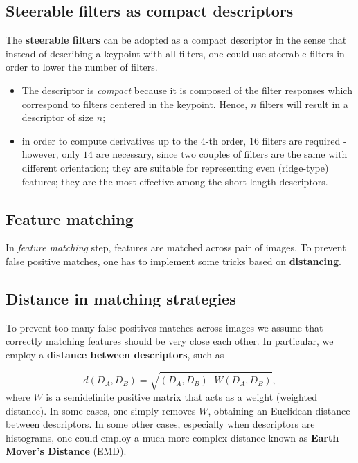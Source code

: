 \documentclass[10pt]{report}
\begin{document}
\subsection{Steerable filters as compact descriptors}
\label{steerable-filters-as-compact-descriptors}
The \textbf{steerable filters} can be adopted as a compact descriptor in the
sense that instead of describing a keypoint with all filters, one could
use steerable filters in order to lower the number of filters.

\begin{itemize}
\item The descriptor is \emph{compact} because it is composed of the filter
responses which correspond to filters centered in the keypoint. Hence,
\(n\) filters will result in a descriptor of size \(n\);
\item in order to compute derivatives up to the \(4\)-th order, \(16\)
filters are required - however, only \(14\) are necessary, since two
couples of filters are the same with different orientation; they are
suitable for representing even (ridge-type) features; they are the
most effective among the short length descriptors.
\end{itemize}

\subsection{Feature matching}
\label{feature-matching}
In \emph{feature matching} step, features are matched across pair of images.
To prevent false positive matches, one has to implement some tricks
based on \textbf{distancing}.

\subsection{Distance in matching strategies}
\label{distance-in-matching-strategies}
To prevent too many false positives matches across images we assume that
correctly matching features should be very close each other. In
particular, we employ a \textbf{distance between descriptors}, such as

\[d(D_A, D_B) = \sqrt{(D_A, D_B)^\top W (D_A, D_B)}, \] where \(W\) is a
semidefinite positive matrix that acts as a weight (weighted distance).
In some cases, one simply removes \(W\), obtaining an Euclidean distance
between descriptors. In some other cases, especially when descriptors
are histograms, one could employ a much more complex distance known as
\textbf{Earth Mover's Distance} (EMD).
\end{document}

